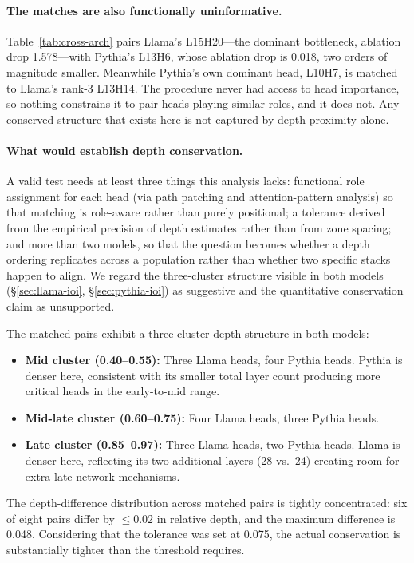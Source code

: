 \documentclass[11pt,a4paper]{article}
\begin{document}
\paragraph{The matches are also functionally uninformative.} Table~\ref{tab:cross-arch}
pairs Llama's L15H20---the dominant bottleneck, ablation drop 1.578---with Pythia's
L13H6, whose ablation drop is 0.018, two orders of magnitude smaller. Meanwhile
Pythia's own dominant head, L10H7, is matched to Llama's rank-3 L13H14. The procedure
never had access to head importance, so nothing constrains it to pair heads playing
similar roles, and it does not. Any conserved structure that exists here is not
captured by depth proximity alone.

\paragraph{What would establish depth conservation.} A valid test needs at least three
things this analysis lacks: functional role assignment for each head (via path
patching and attention-pattern analysis) so that matching is role-aware rather than
purely positional; a tolerance derived from the empirical precision of depth
estimates rather than from zone spacing; and more than two models, so that the
question becomes whether a depth ordering replicates across a population rather than
whether two specific stacks happen to align. We regard the three-cluster structure
visible in both models (\S\ref{sec:llama-ioi}, \S\ref{sec:pythia-ioi}) as suggestive
and the quantitative conservation claim as unsupported.

The matched pairs exhibit a three-cluster depth structure in both models:

\begin{itemize}
  \item \textbf{Mid cluster (0.40--0.55):} Three Llama heads, four Pythia heads.
    Pythia is denser here, consistent with its smaller total layer count producing more
    critical heads in the early-to-mid range.
  \item \textbf{Mid-late cluster (0.60--0.75):} Four Llama heads, three Pythia heads.
  \item \textbf{Late cluster (0.85--0.97):} Three Llama heads, two Pythia heads. Llama
    is denser here, reflecting its two additional layers (28 vs.\ 24) creating room
    for extra late-network mechanisms.
\end{itemize}

The depth-difference distribution across matched pairs is tightly concentrated: six of
eight pairs differ by $\leq 0.02$ in relative depth, and the maximum difference is
0.048. Considering that the tolerance was set at 0.075, the actual conservation is
substantially tighter than the threshold requires.
\end{document}
